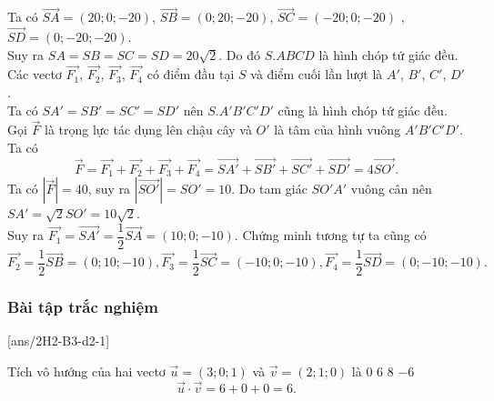 \begin{vd}
{\begin{center}
		\end{center}
		Ta có $\overrightarrow{SA} = (20; 0; -20)$, $\overrightarrow{SB} = (0; 20; -20)$, $\overrightarrow{SC} = (-20; 0; -20)$ , $\overrightarrow{SD} = (0; -20; -20)$.\\
		Suy ra $SA = SB = SC = SD = 20\sqrt{2}$. Do đó $S.ABCD$ là hình chóp tứ giác đều.
		Các vectơ $\overrightarrow{F_1}$, $\overrightarrow{F_2}$, $\overrightarrow{F_3}$, $\overrightarrow{F_4}$ có điểm đầu tại $S$ và điểm cuối lần lượt là $A'$, $B'$, $C'$, $D'$.\\
		Ta có $SA' = SB' = SC' = SD'$ nên $S.A'B'C'D'$ cũng là hình chóp tứ giác đều.\\
		Gọi $\overrightarrow{F} $ là trọng lực tác dụng lên chậu cây và $O'$ là tâm của hình vuông $A'B'C'D'$. Ta có
		\[ \overrightarrow{F} =\overrightarrow{F_1} + \overrightarrow{F_2}+ \overrightarrow{F_3}+ \overrightarrow{F_4} = \overrightarrow{SA'} + \overrightarrow{SB'}+ \overrightarrow{SC'}+ \overrightarrow{SD'} = 4\overrightarrow{SO'}.\]
		Ta có $\left| \overrightarrow{F} \right| =40$, suy ra $\left| \overrightarrow{SO'} \right| = SO' = 10$.
		Do tam giác $SO'A'$ vuông cân nên $SA' = \sqrt{2}SO' = 10\sqrt{2}$.\\
		Suy ra $\overrightarrow{F_1} = \overrightarrow{SA'} = \dfrac{1}{2}\overrightarrow{SA}  = (10; 0; -10)$.
		Chứng minh tương tự ta cũng có\\
		\[ \overrightarrow{F_2} = \dfrac{1}{2}\overrightarrow{SB}  = (0; 10; -10), \overrightarrow{F_3} = \dfrac{1}{2}\overrightarrow{SC}  = (-10; 0; -10), \overrightarrow{F_4} = \dfrac{1}{2}\overrightarrow{SD}  = (0; -10; -10). \]
	}
\end{vd}

\subsubsection{Bài tập trắc nghiệm}
\TN
{}[ans/2H2-B3-d2-1]

\begin{ex}
	Tích vô hướng của hai vectơ $\vec{u}=(3;0;1)$ và $\vec{v}=(2;1;0)$ là
	\choice
	{$0$}
	{\True$6$}
	{$8$}
	{$-6$}
	\loigiai
	{
		$$\vec{u}\cdot\vec{v}=6+0+0=6.$$
	}
\end{ex} 

